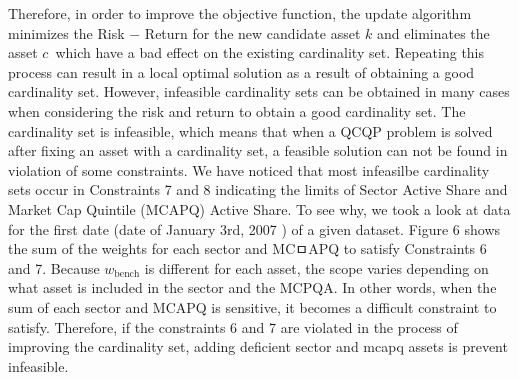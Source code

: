 \documentclass[11pt]{article}
\begin{document}
\begin{itemize}
\begin{itemize}
	\end{itemize}
	Therefore, in order to improve the objective function, the update algorithm minimizes the Risk $-$ Return for the new candidate asset $k$ and eliminates the asset $c$\textasciiacute$\,$ which have a bad effect on the existing cardinality set. Repeating this process can result in a local optimal solution as a result of obtaining a good cardinality set. However, infeasible cardinality sets can be obtained in many cases when considering the risk and return to obtain a good cardinality set. The cardinality set is infeasible, which means that when a QCQP problem is solved after fixing an asset with a cardinality set, a feasible solution can not be found in violation of some constraints. We have noticed that most infeasilbe cardinality sets occur in Constraints 7 and 8 indicating the limits of Sector Active Share and Market Cap Quintile (MCAPQ) Active Share.
	To see why, we took a look at data for the first date (date of January 3rd, 2007 ) of a given dataset. Figure 6 shows the sum of the weights for each sector and MCㅁAPQ to satisfy Constraints 6 and 7. Because $w_\text{bench} $ is different for each asset, the scope varies depending on what asset is included in the sector and the MCPQA. In other words, when the sum of each sector and MCAPQ is sensitive, it becomes a difficult constraint to satisfy. Therefore, if the constraints 6 and 7 are violated in the process of improving the cardinality set, adding deficient sector and mcapq assets is prevent infeasible. 
\begin{figure}[h]
	\begin{center}
\end{center}
\end{figure}
\end{itemize}
\end{document}

